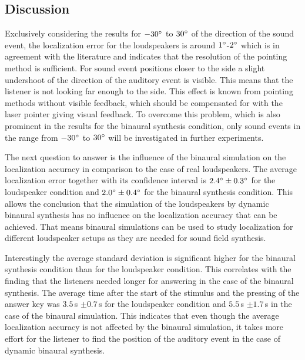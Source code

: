 \subsection{Discussion}
%
Exclusively considering the results for $-30^\circ$ to $30^\circ$ of the direction
of the sound event, the localization error for the loudspeakers
is around $1^\circ$-$2^\circ$ which is in agreement with the literature and
indicates that the resolution of the pointing method is sufficient. For sound
event positions closer to the side a slight undershoot of the direction of the
auditory event is visible. This means that the listener is not looking far enough
to the side. This effect is known from pointing methods without visible
feedback, which should be compensated for with the laser pointer giving visual
feedback. To overcome this problem, which is also prominent in the results for
the binaural synthesis condition, only sound events in the range from
$-30^\circ$ to $30^\circ$ will be investigated in further experiments.

The next question to answer is the influence of the binaural simulation on the
localization accuracy in comparison to the case of real loudspeakers. The
average localization error together with its confidence interval is $2.4^\circ
\pm 0.3^\circ$ for the loudspeaker condition and $2.0^\circ \pm 0.4^\circ$
for the binaural synthesis condition. This allows the conclusion that the
simulation of the loudspeakers by dynamic binaural synthesis has no influence on
the localization accuracy that can be achieved. That means binaural
simulations can be used to study localization for different loudspeaker setups
as they are needed for sound field synthesis.

Interestingly the average standard deviation is significant higher for
the binaural synthesis condition than for the loudspeaker condition. This
correlates with the finding that the listeners needed longer for answering in the case
of the binaural synthesis. The average time after the start of the stimulus and
the pressing of the answer key was $3.5$\,s $\pm 0.7$\,s for the loudspeaker
condition and $5.5$\,s $\pm 1.7$\,s in the case of the binaural simulation.
This indicates that even though the average localization accuracy is not affected by
the binaural simulation, it takes more effort for the listener to find the
position of the auditory event in the case of dynamic binaural synthesis.

